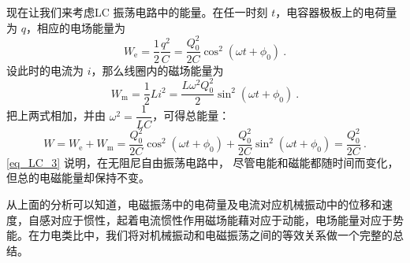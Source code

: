 现在让我们来考虑LC 振荡电路中的能量。在任一时刻 $t$，电容器极板上的电荷量为 $q$，相应的电场能量为
\begin{equation}
W_{\mathrm e}=\frac{1}{2} \frac{q^{2}}{C}=\frac{Q_{0}^{2}}{2 C} \cos ^{2}\left(\omega t+\phi_{0}\right)~.
\end{equation}
设此时的电流为 $i$，那么线圈内的磁场能量为
\begin{equation}
W_{\mathrm{m}}=\frac{1}{2} L i^{2}=\frac{L \omega^{2} Q_{0}^{2}}{2} \sin ^{2}\left(\omega t+\phi_{0}\right)~.
\end{equation}
把上两式相加，并由 $\omega^{2}=\dfrac{1}{L C}$，可得总能量：
\begin{equation} \label{eq_LC_3}
W=W_{\mathrm{e}}+W_{\mathrm{m}}=\frac{Q_{0}^{2}}{2 C} \cos ^{2}\left(\omega t+\phi_{0}\right)+\frac{Q_{0}^{2}}{2 C} \sin ^{2}\left(\omega t+\phi_{0}\right)=\frac{Q_{0}^{2}}{2 C}~.
\end{equation}
\autoref{eq_LC_3} 说明，在无阻尼自由振荡电路中， 尽管电能和磁能都随时间而变化，但总的电磁能量却保持不变。

从上面的分析可以知道，电磁振荡中的电荷量及电流对应机械振动中的位移和速度，自感对应于惯性，起着电流惯性作用磁场能藉对应于动能，电场能量对应于势能。在力电类比中，我们将对机械振动和电磁振荡之间的等效关系做一个完整的总结。
